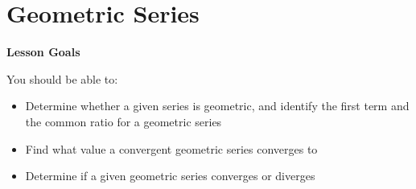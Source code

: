 \documentclass[main]{subfiles}
\begin{document}
\ifSubfilesClassLoaded{%
  \chaptermark{\chaptertwo}
}{}

\section{Geometric Series} \label{ws2-6}
\begin{framed}
\centerline{\textbf{Lesson Goals}}

You should be able to:
\begin{itemize}
\item Determine whether a given series is geometric, and identify the first term and the common ratio for a geometric series
\item Find what value a convergent geometric series converges to 
\item Determine if a given geometric series converges or diverges
\end{itemize}
\end{framed}
\end{document}
